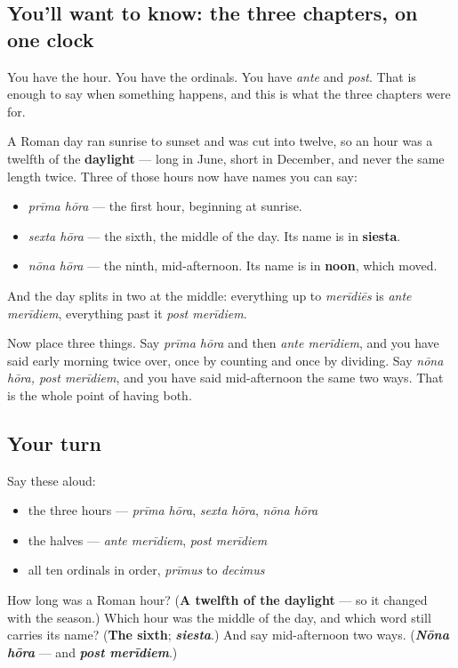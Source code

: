 \subsection*{You'll want to know: the three chapters, on one clock}
You have the hour. You have the ordinals. You have \emph{ante} and \emph{post}. That is enough to say when something happens, and this is what the three chapters were for.

A Roman day ran sunrise to sunset and was cut into twelve, so an hour was a twelfth of the \textbf{daylight} — long in June, short in December, and never the same length twice. Three of those hours now have names you can say:

\begin{itemize}
\raggedright
  \item \emph{prīma hōra} — the first hour, beginning at sunrise.
  \item \emph{sexta hōra} — the sixth, the middle of the day. Its name is in \textbf{siesta}.
  \item \emph{nōna hōra} — the ninth, mid-afternoon. Its name is in \textbf{noon}, which moved.
\end{itemize}

And the day splits in two at the middle: everything up to \emph{merīdiēs} is \emph{ante merīdiem}, everything past it \emph{post merīdiem}.

Now place three things. Say \emph{prīma hōra} and then \emph{ante merīdiem}, and you have said early morning twice over, once by counting and once by dividing. Say \emph{nōna hōra, post merīdiem}, and you have said mid-afternoon the same two ways. That is the whole point of having both.

\subsection*{Your turn}
Say these aloud:

\begin{itemize}
\raggedright
  \item the three hours — \emph{prīma hōra}, \emph{sexta hōra}, \emph{nōna hōra}
  \item the halves — \emph{ante merīdiem}, \emph{post merīdiem}
  \item all ten ordinals in order, \emph{prīmus} to \emph{decimus}
\end{itemize}

\begin{tcolorbox}[breakable,colback=teal!4,colframe=teal!35!black,title={Before you move on}]
How long was a Roman hour? (\textbf{A twelfth of the daylight} — so it changed with the season.) Which hour was the middle of the day, and which word still carries its name? (\textbf{The sixth}; \emph{\textbf{siesta}}.) And say mid-afternoon two ways. (\emph{\textbf{Nōna hōra}} — and \emph{\textbf{post merīdiem}}.)
\end{tcolorbox}

